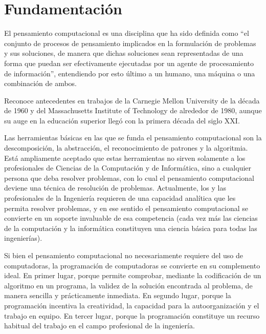 \documentclass[
  letterpaper,
  DIV=11,
  numbers=noendperiod]{scrreprt}
\begin{document}
\hypertarget{fundamentaciuxf3n}{%
\section*{Fundamentación}\label{fundamentaciuxf3n}}


El pensamiento computacional es una disciplina que ha sido definida como
``el conjunto de procesos de pensamiento implicados en la formulación de
problemas y sus soluciones, de manera que dichas soluciones sean
representadas de una forma que puedan ser efectivamente ejecutadas por
un agente de procesamiento de información'', entendiendo por esto último
a un humano, una máquina o una combinación de ambos.

Reconoce antecedentes en trabajos de la Carnegie Mellon University de la
década de 1960 y del Massachusetts Institute of Technology de alrededor
de 1980, aunque su auge en la educación superior llegó con la primera
década del siglo XXI.

Las herramientas básicas en las que se funda el pensamiento
computacional son la descomposición, la abstracción, el reconocimiento
de patrones y la algoritmia. Está ampliamente aceptado que estas
herramientas no sirven solamente a los profesionales de Ciencias de la
Computación y de Informática, sino a cualquier persona que deba resolver
problemas, con lo cual el pensamiento computacional deviene una técnica
de resolución de problemas. Actualmente, los y las profesionales de la
Ingeniería requieren de una capacidad analítica que les permita resolver
problemas, y en ese sentido el pensamiento computacional se convierte en
un soporte invaluable de esa competencia (cada vez más las ciencias de
la computación y la informática constituyen una ciencia básica para
todas las ingenierías).

Si bien el pensamiento computacional no necesariamente requiere del uso
de computadoras, la programación de computadoras se convierte en su
complemento ideal. En primer lugar, porque permite comprobar, mediante
la codificación de un algoritmo en un programa, la validez de la
solución encontrada al problema, de manera sencilla y prácticamente
inmediata. En segundo lugar, porque la programación incentiva la
creatividad, la capacidad para la autoorganización y el trabajo en
equipo. En tercer lugar, porque la programación constituye un recurso
habitual del trabajo en el campo profesional de la ingeniería.
\end{document}
